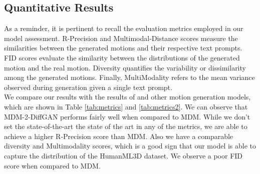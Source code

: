 \documentclass[10pt,twocolumn,letterpaper]{article}
\begin{document}
\subsection{Quantitative Results}

As a reminder, it is pertinent to recall the evaluation metrics employed in our model assessment. R-Precision and Multimodal-Distance scores measure the similarities 
between the generated motions and their respective text prompts. FID scores evaluate the similarity between the distributions of the generated motion and the real 
motion. Diversity quantifies the variability or dissimilarity among the generated motions. Finally, MultiModality refers to the mean variance observed during 
generation given a single text prompt.
\\

We compare our results with the results of \cite{Tevet23} and other motion generation models, which are shown in Table \ref{tab:metrics} 
and \ref{tab:metrics2}. We can observe that MDM-2-DiffGAN performs fairly well when compared to MDM. While we don't set the state-of-the-art
the state of the art in any of the metrics, we are able to achieve a higher R-Precision score than MDM. Also we have a comparable diversity and Multimodality
scores, which is a good sign that our model is able to capture the distribution of the HumanML3D dataset. We observe a poor FID score when
compared to MDM. 
\end{document}
